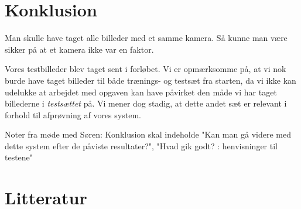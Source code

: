 \documentclass[11pt,a4paper,draft]{article}
\begin{document}
\begin{comment}

Skal vi have arbejdsopgaverne med i rapporten og så bedømmes de?

Blev spørgsmålene besvaret:

Hvordan kan nummerplader på farvefotografier identificeres og læses af et computersystem? Hvilke kendte metoder findes der, og hvor høj genkendelsesprocent kan et system vi selv laver opnå?

\end{comment}

\section{Konklusion}
Man skulle have taget alle billeder med et samme kamera. Så kunne man være sikker på at et kamera ikke var en faktor.

Vores testbilleder blev taget sent i forløbet. Vi er opmærksomme på, at vi nok burde have taget  billeder til både trænings- og testsæt fra starten, da vi ikke kan udelukke at arbejdet med opgaven kan have påvirket den måde vi har taget billederne i \textit{testsættet} på. Vi mener dog stadig, at dette andet sæt er relevant i forhold til afprøvning af vores system.

Noter fra møde med Søren: Konklusion skal indeholde "Kan man gå videre med dette system efter de påviste resultater?", "Hvad gik godt? : henvisninger til testene"


\newpage %
%
\section{Litteratur}
\end{document}

